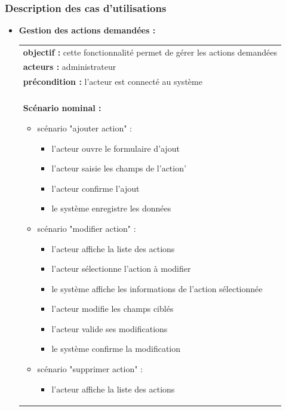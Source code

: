 \subsubsection*{Description des cas d’utilisations }
\begin{itemize}[label=\textbullet]
\item \textbf{Gestion des actions demandées :}
\begin{table}[!h]
\begin{tabular}{|p{15cm}|}%
\rowcolor{shadecolor}\multicolumn{1}{|c|}{Sommaire d’indentification} \\
\hline
\textbf{objectif : } cette fonctionnalité permet de gérer les actions demandées\\
\textbf{acteurs : } administrateur\\
\textbf{précondition : } l'acteur est connecté au système\\
\hline
\rowcolor{shadecolor}\multicolumn{1}{|c|}{Description des scénarios} \\
\hline
	\textbf{Scénario nominal :}
	\begin{itemize}[label=\textbullet]
	\item scénario "ajouter action" :
		\begin{itemize}
		\item l'acteur ouvre le formulaire d'ajout
		\item l'acteur saisie les champs de l'action'
		\item l'acteur confirme l'ajout
		\item le système enregistre les données
		\end{itemize}
	\item scénario "modifier action" :
		\begin{itemize}
		\item l'acteur affiche la liste des actions
		\item l'acteur sélectionne l'action à modifier
		\item le système affiche les informations de l'action sélectionnée
		\item l'acteur modifie les champs ciblés
		\item l'acteur valide ses modifications
		\item le système confirme la modification
		\end{itemize}
	\item scénario "supprimer action" :
		\begin{itemize}
		\item l'acteur affiche la liste des actions

\end{itemize}
\end{itemize}
\end{tabular}
\end{table}
\end{itemize}

